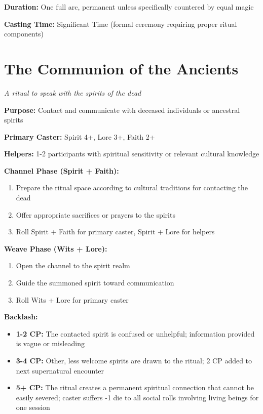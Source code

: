 \documentclass[12pt,twoside]{book}
\begin{document}
\textbf{Duration:} One full arc, permanent unless specifically countered by equal magic

\textbf{Casting Time:} Significant Time (formal ceremony requiring proper ritual components)

\section*{The Communion of the Ancients}
\textit{A ritual to speak with the spirits of the dead}

\textbf{Purpose:} Contact and communicate with deceased individuals or ancestral spirits

\textbf{Primary Caster:} Spirit 4+, Lore 3+, Faith 2+

\textbf{Helpers:} 1-2 participants with spiritual sensitivity or relevant cultural knowledge

\textbf{Channel Phase (Spirit + Faith):}
\begin{enumerate}
\item Prepare the ritual space according to cultural traditions for contacting the dead
\item Offer appropriate sacrifices or prayers to the spirits
\item Roll Spirit + Faith for primary caster, Spirit + Lore for helpers
\end{enumerate}

\textbf{Weave Phase (Wits + Lore):}
\begin{enumerate}
\item Open the channel to the spirit realm
\item Guide the summoned spirit toward communication
\item Roll Wits + Lore for primary caster
\end{enumerate}

\textbf{Backlash:}
\begin{itemize}
\item \textbf{1-2 CP:} The contacted spirit is confused or unhelpful; information provided is vague or misleading
\item \textbf{3-4 CP:} Other, less welcome spirits are drawn to the ritual; 2 CP added to next supernatural encounter
\item \textbf{5+ CP:} The ritual creates a permanent spiritual connection that cannot be easily severed; caster suffers -1 die to all social rolls involving living beings for one session
\end{itemize}
\end{document}
